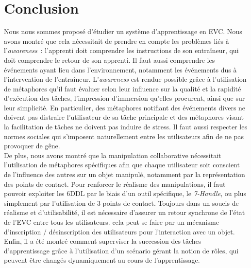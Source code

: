 \documentclass[11pt]{article}
\begin{document}
\section{Conclusion}

Nous nous sommes proposé d'étudier un système d'apprentissage en EVC. Nous avons montré que cela nécessitait de prendre en compte les problèmes liés à l'\textit{awareness}~: l'apprenti doit comprendre les instructions de son entraîneur, qui doit comprendre le retour de son apprenti. Il faut aussi comprendre les événements ayant lieu dans l'environnement, notamment les événements dus à l'intervention de l'entraîneur. L'\textit{awareness} est rendue possible grâce à l'utilisation de métaphores qu'il faut évaluer selon leur influence sur la qualité et la rapidité d'exécution des tâches, l'impression d'immersion qu'elles procurent, ainsi que sur leur simplicité. En particulier, des métaphores notifiant des événements divers ne doivent pas distraire l'utilisateur de sa tâche principale et des métaphores visant la facilitation de tâches ne doivent pas induire de stress. Il faut aussi respecter les normes sociales qui s'imposent naturellement entre les utilisateurs afin de ne pas provoquer de gêne.
\\

De plus, nous avons montré que la manipulation collaborative nécessitait l'utilisation de métaphores spécifiques afin que chaque utilisateur soit conscient de l'influence des autres sur un objet manipulé, notamment par la représentation des points de contact. Pour renforcer le réalisme des manipulations, il faut pouvoir exploiter les 6DDL par le biais d'un outil spécifique, le \textit{7-Handle}, ou plus simplement par l'utilisation de 3 points de contact. Toujours dans un soucis de réalisme et d'utilisabilité, il est nécessaire d'assurer un retour synchrone de l'état de l'EVC entre tous les utilisateurs. cela peut se faire par un mécanisme d'inscription / désinscription des utilisateurs pour l'interaction avec un objet. Enfin, il a été montré comment superviser la succession des tâches d'apprentissage grâce à l'utilisation d'un scénario gérant la notion de rôles, qui peuvent être changés dynamiquement au cours de l'apprentissage.
\\
\end{document}
